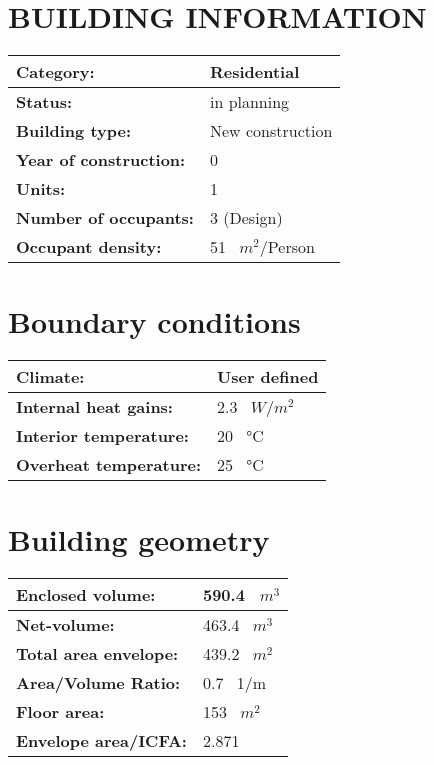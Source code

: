 \documentclass{article}
\begin{document}
\section*{BUILDING INFORMATION}
\begin{longtable}{| l | l |}
\hline
\textbf{Category:} & Residential \\
\hline
\textbf{Status:} & in planning \\
\hline
\textbf{Building type:} & New construction \\
\hline
\textbf{Year of construction:} & 0 \\
\hline
\textbf{Units:} & 1 \\
\hline
\textbf{Number of occupants:} & 3 (Design) \\
\hline
\textbf{Occupant density:} & 51 \, $m^2$/Person \\
\hline
\end{longtable}

\section*{Boundary conditions}
\begin{longtable}{| l | l |}
\hline
\textbf{Climate:} & User defined \\
\hline
\textbf{Internal heat gains:} & 2.3 \, $W/m^2$ \\
\hline
\textbf{Interior temperature:} & 20 \, °C \\
\hline
\textbf{Overheat temperature:} & 25 \, °C \\
\hline
\end{longtable}

\section*{Building geometry}
\begin{longtable}{| l | l |}
\hline
\textbf{Enclosed volume:} & 590.4 \, $m^3$ \\
\hline
\textbf{Net-volume:} & 463.4 \, $m^3$ \\
\hline
\textbf{Total area envelope:} & 439.2 \, $m^2$ \\
\hline
\textbf{Area/Volume Ratio:} & 0.7 \, 1/m \\
\hline
\textbf{Floor area:} & 153 \, $m^2$ \\
\hline
\textbf{Envelope area/ICFA:} & 2.871 \\
\hline
\end{longtable}
\end{document}
